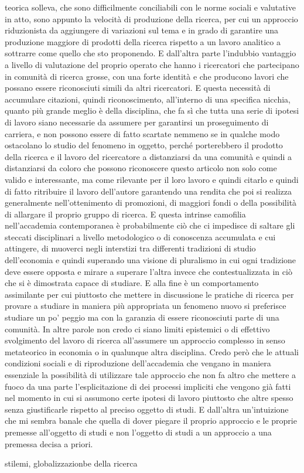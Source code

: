 \documentclass[a4paper, headings=standardclasses]{scrartcl}
\begin{document}
teorica solleva, che sono difficilmente conciliabili con le norme sociali e valutative in atto,
sono appunto la velocità di produzione della ricerca, per cui un approccio riduzionista
da aggiungere di variazioni sul tema e in grado di garantire una produzione maggiore di prodotti
della ricerca rispetto a un lavoro analitico a sottrarre come quello che sto proponendo.
E dall'altra parte l'indubbio vantaggio a livello di valutazione del proprio operato che hanno i
ricercatori che partecipano in comunità di ricerca grosse, con una forte identità e che
producono lavori che possano essere riconosciuti simili da altri ricercatori.
E questa necessità di accumulare citazioni, quindi riconoscimento, all'interno di una
specifica nicchia, quanto più grande meglio è della disciplina, che fa sì che tutta una serie
di ipotesi di lavoro siano necessarie da assumere per garantirsi un proseguimento di carriera,
e non possono essere di fatto scartate nemmeno se in qualche modo ostacolano lo studio del
fenomeno in oggetto, perché porterebbero il prodotto della ricerca e il lavoro del ricercatore
a distanziarsi da una comunità e quindi a distanziarsi da coloro che possono riconoscere
questo articolo non solo come valido e interessante, ma come rilevante per il loro lavoro e quindi
citarlo e quindi di fatto ritribuire il lavoro dell'autore garantendo una rendita che poi si
realizza generalmente nell'ottenimento di promozioni, di maggiori fondi o della possibilità
di allargare il proprio gruppo di ricerca. E questa intrinse camofilia nell'accademia contemporanea
è probabilmente ciò che ci impedisce di saltare gli steccati disciplinari a livello metodologico
o di conoscenza accumulata e cui attingere, di muoverci negli interstizi tra differenti tradizioni
di studio dell'economia e quindi superando una visione di pluralismo in cui ogni tradizione
deve essere opposta e mirare a superare l'altra invece che contestualizzata in ciò che si è
dimostrata capace di studiare. E alla fine è un comportamento assimilante per cui piuttosto
che mettere in discussione le pratiche di ricerca per provare a studiare in maniera più appropriata
un fenomeno nuovo si preferisce studiare un po' peggio ma con la garanzia di essere riconosciuti
parte di una comunità. In altre parole non credo ci siano limiti epistemici o di effettivo svolgimento
del lavoro di ricerca all'assumere un approccio complesso in senso metateorico in economia o in qualunque
altra disciplina. Credo però che le attuali condizioni sociali e di riproduzione dell'accademia
che vengano in maniera essenziale la possibilità di utilizzare tale approccio che non fa altro che
mettere a fuoco da una parte l'esplicitazione di dei processi impliciti che vengono già fatti
nel momento in cui si assumono certe ipotesi di lavoro piuttosto che altre spesso senza giustificarle
rispetto al preciso oggetto di studi. E dall'altra un'intuizione che mi sembra banale
che quella di dover piegare il proprio approccio e le proprie premesse all'oggetto di studi
e non l'oggetto di studi a un approccio a una premessa decisa a priori.

stilemi, globalizzazionbe della ricerca

\begin{refcontext}[sorting=nyt]
	\printbibliography
\end{refcontext}
\end{document}
